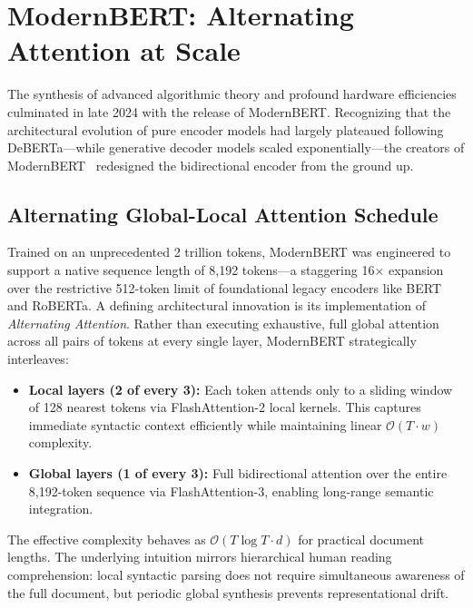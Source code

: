 \documentclass[11pt]{article}
\begin{document}
\section{ModernBERT: Alternating Attention at Scale}

The synthesis of advanced algorithmic theory and profound hardware efficiencies culminated in late 2024 with the release of ModernBERT. Recognizing that the architectural evolution of pure encoder models had largely plateaued following DeBERTa—while generative decoder models scaled exponentially—the creators of ModernBERT~\cite{warner2024smarter} redesigned the bidirectional encoder from the ground up.

\subsection{Alternating Global-Local Attention Schedule}

Trained on an unprecedented 2 trillion tokens, ModernBERT was engineered to support a native sequence length of 8,192 tokens—a staggering 16$\times$ expansion over the restrictive 512-token limit of foundational legacy encoders like BERT and RoBERTa. A defining architectural innovation is its implementation of \emph{Alternating Attention}. Rather than executing exhaustive, full global attention across all pairs of tokens at every single layer, ModernBERT strategically interleaves:
\begin{itemize}
  \item \textbf{Local layers (2 of every 3):} Each token attends only to a sliding window of 128 nearest tokens via FlashAttention-2 local kernels. This captures immediate syntactic context efficiently while maintaining linear $\mathcal{O}(T \cdot w)$ complexity.
  \item \textbf{Global layers (1 of every 3):} Full bidirectional attention over the entire 8,192-token sequence via FlashAttention-3, enabling long-range semantic integration.
\end{itemize}
The effective complexity behaves as $\mathcal{O}(T \log T \cdot d)$ for practical document lengths. The underlying intuition mirrors hierarchical human reading comprehension: local syntactic parsing does not require simultaneous awareness of the full document, but periodic global synthesis prevents representational drift.
\end{document}
